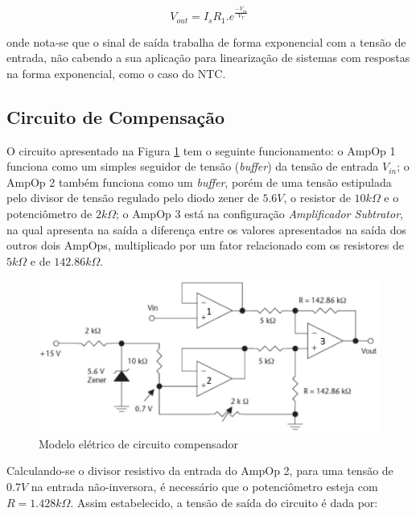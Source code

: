 \documentclass[a4paper]{instrumentacao}
\begin{document}
\begin{equation}
	V_{out}=I_s R_1.e^\frac{-V_{in}}{V_T}
	\label{eq:ampalog-transdiodo-saida}
\end{equation}

\noindent
onde nota-se que o sinal de saída trabalha de forma exponencial com a tensão de entrada, não cabendo a sua aplicação para linearização de sistemas com respostas na forma exponencial, como o caso do NTC.

\subsection{Circuito de Compensação}

O circuito apresentado na Figura \ref{fig:ckt-compensador} tem o seguinte funcionamento: o AmpOp 1 funciona como um simples seguidor de tensão (\textit{buffer}) da tensão de entrada $V_{in}$; o AmpOp 2 também funciona como um \textit{buffer}, porém de uma tensão estipulada pelo divisor de tensão regulado pelo diodo zener de $5.6V$, o resistor de $10k\Omega$ e o potenciômetro de $2k\Omega$; o AmpOp 3 está na configuração \textit{Amplificador Subtrator}, na qual apresenta na saída a diferença entre os valores apresentados na saída dos outros dois AmpOps, multiplicado por um fator relacionado com os resistores de $5k\Omega$ e de $142.86k\Omega$.

\begin{figure}[H]
\center
\includegraphics[width=\textwidth]{ckt_compensacao.jpg}
\caption{Modelo elétrico de circuito compensador}
\label{fig:ckt-compensador}
\end{figure}

Calculando-se o divisor resistivo da entrada do AmpOp 2, para uma tensão de $0.7V$ na entrada não-inversora, é necessário que o potenciômetro esteja com $R=1.428k\Omega$. Assim estabelecido, a tensão de saída do circuito é dada por:
\end{document}
